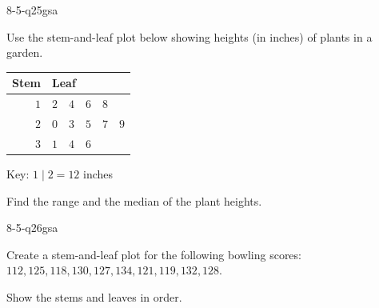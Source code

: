 \begin{practiceQuestion}{8-5-q25}{gsa}
\begin{questionText}
Use the stem-and-leaf plot below showing heights (in inches) of plants in a garden.

\begin{center}
\begin{tabular}{r|l}
\textbf{Stem} & \textbf{Leaf} \\
\hline
$1$ & $2 \quad 4 \quad 6 \quad 8$ \\
$2$ & $0 \quad 3 \quad 5 \quad 7 \quad 9$ \\
$3$ & $1 \quad 4 \quad 6$ \\
\end{tabular}
\end{center}

Key: $1 \mid 2 = 12$ inches

Find the range and the median of the plant heights.
\end{questionText}
\end{practiceQuestion}

\begin{practiceQuestion}{8-5-q26}{gsa}
\begin{questionText}
Create a stem-and-leaf plot for the following bowling scores: $112, 125, 118, 130, 127, 134, 121, 119, 132, 128$.

Show the stems and leaves in order.
\end{questionText}
\end{practiceQuestion}

